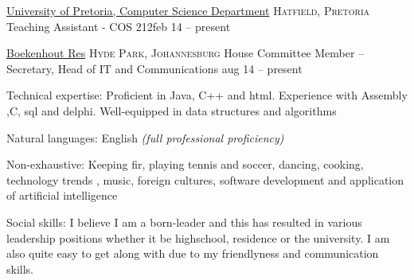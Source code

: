 \headedsection  %
  {\href{http://www.cs.up.ac.za}{University of Pretoria, Computer Science Department}}
  {\textsc{Hatfield, Pretoria}} {%
  \headedsubsection
    {Teaching Assistant - COS 212}{feb 14 --  present}
    {}
    }
    
\headedsection  %
  {\href{http://www.up.ac.za/boekenhout}{Boekenhout Res}}
  {\textsc{Hyde Park, Johannesburg}} {%
  \headedsubsection
    {House Committee Member – Secretary, Head of IT and Communications   }
    {aug 14 – present}
    {}
}
    
\spacedhrule{-0.2em}{-0.4em}



\inlineheadsection  %
  {Technical expertise:}
  {Proficient in Java, C++ and html. Experience with Assembly ,C, sql and delphi. Well-equipped in data structures and algorithms}

\vspace{0.5em}
\inlineheadsection
  {Natural languages:}
  {English \emph{(full professional proficiency)}}


\spacedhrule{1.6em}{-0.4em}

\inlineheadsection
  {Non-exhaustive:}
  {Keeping fir, playing tennis and soccer, dancing, cooking, technology trends , music, foreign cultures, software development and application of artificial intelligence}

  
\spacedhrule{1.6em}{-0.4em}  
  

\inlineheadsection
  {Social skills:}
  {I believe I am a born-leader and this has resulted in various leadership positions whether it be highschool, residence or the university. I am also quite easy to get along with due to my friendlyness and communication skills.}
  
